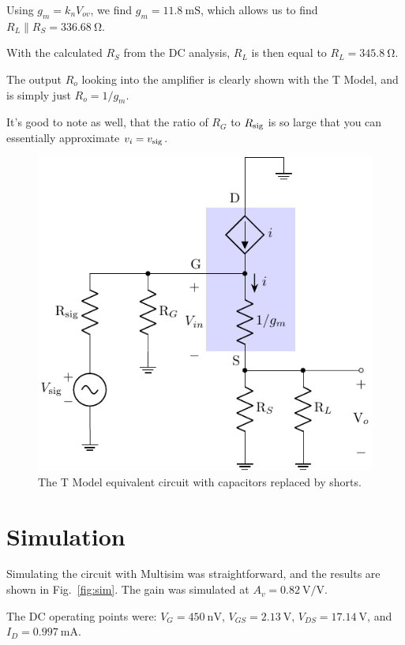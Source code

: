 \documentclass{../../ece-report}
\begin{document}
Using $g_m = k_n V_{ov}$, we find $g_m = 11.8~\si{\m\siemens}$, which
allows us to find $R_L \| R_S = 336.68~\si{\ohm}$.

With the calculated $R_S$ from the DC analysis, $R_L$
is then equal to $R_L = 345.8~\si{\ohm}$.

The output $R_o$ looking into the amplifier is clearly
shown with the T Model, and is simply just $R_o = 1/g_m$.

It's good to note as well, that the ratio of $R_G$ to $R_\textnormal{sig}$ is
so large that you can essentially approximate $v_i = v_\textnormal{sig}$.

\begin{figure}[h!]
  \centering
    \includegraphics{../circuits/circuit_t_model.pdf}
  \caption{The T Model equivalent circuit with capacitors replaced by shorts.}\label{fig:circuit_t_model}
\end{figure}


\section{Simulation}

Simulating the circuit with Multisim was straightforward, and the results are
shown in Fig.~\ref{fig:sim}. The gain was simulated at $A_v = 0.82~\si{\V/\V}$.

The DC operating points were: $V_G = 450~\si{\nV}$,
$V_{GS} = 2.13~\si{\V}$, $V_{DS} = 17.14~\si{\V}$, and 
$I_D = 0.997~\si{\mA}$.
\end{document}
